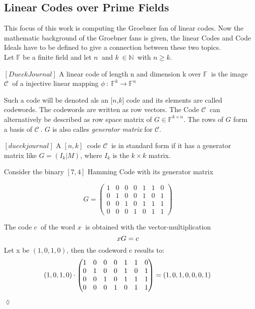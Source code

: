    

\newpage

\subsection{Linear Codes over Prime Fields}
\label{subsec:linearcodes}
This focus of this work is computing the Groebner fan of linear codes. Now the mathematic background of the Groebner fans is given, the linear Codes and Code Ideals have to be defined to give a connection between these two topics.\\ 
Let $\mathbb{F}$ be a finite field and let $n~$ and $k~\in \mathbb{N}~$ with $n\geq k$.
\begin{env_definition}
$ [Dueck Journal ] $ A linear code of length n and dimension k over $\mathbb{F}~$ is the image $\mathcal{C}~$ of a injective linear mapping $\phi~:~\mathbb{F}^{k} \rightarrow \mathbb{F}^{n}  $
\end{env_definition} 
Such a code will be denoted als an [$n$,$k$] code and its elements are called codewords. The codewords are written 
as row vectors. The Code $\mathcal{C}~$ can alternatively be described as row space matrix of $G \in \mathbb{F}^{k \times n}$. The rows of $G$ form a basis of $\mathcal{C}~$.
$G$ is also calles \textit{generator matrix} for $\mathcal{C}$.

\begin{env_definition}
$[dueckjournal]$
A $[n,k]~$ code $\mathcal{C}~$ is in standard form if it has a generator matrix like $G = (I_{k}| M)$, where $I_{k}$ is the $k \times k$ matrix.
\end{env_definition}


\begin{env_example}\normalfont
Consider the binary $[7,4]$ Hamming Code with its generator matrix

\[
G =
\begin{pmatrix}
1 & 0 & 0 & 0 & 1 & 1 & 0 \\ 
0 & 1 & 0 & 0 & 1 & 0 & 1 \\  
0 & 0 & 1 & 0 & 1 & 1 & 1 \\ 
0 & 0 & 0 & 1 & 0 & 1 & 1
\end{pmatrix} 
\]

The code $c~$ of the word $x~$ is obtained with the vector-multiplication
\[
     xG = c \\
 \]
 Let x be $\left(1,0,1,0\right)$, then the codeword c results to:
 \[
      \left(1,0,1,0\right) \cdot \begin{pmatrix}
      1 & 0 & 0 & 0 & 1 & 1 & 0 \\ 
      0 & 1 & 0 & 0 & 1 & 0 & 1 \\  
      0 & 0 & 1 & 0 & 1 & 1 & 1 \\ 
      0 & 0 & 0 & 1 & 0 & 1 & 1
      \end{pmatrix}   = \left(1,0,1,0,0,0,1\right) \\
  \]
\begin{flushright}
$\lozenge$
\end{flushright} 

\end{env_example}

